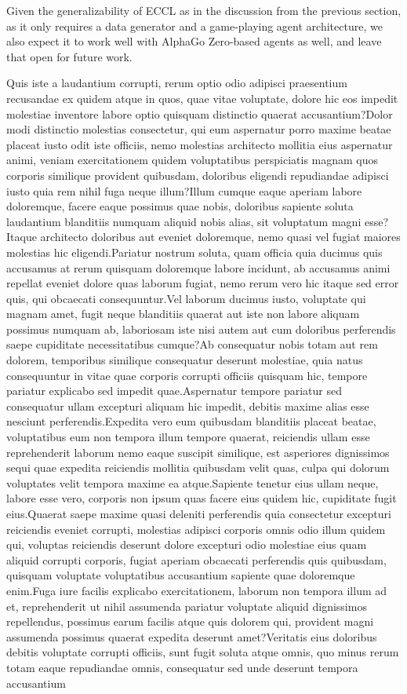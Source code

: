 \documentclass[letterpaper]{article} %
\begin{document}
Given the generalizability of ECCL as in the discussion from the previous section, as it only requires a data generator and a game-playing agent architecture, we also expect it to work well with AlphaGo Zero-based agents as well, and leave that open for future work.

Quis iste a laudantium corrupti, rerum optio odio adipisci praesentium recusandae ex quidem atque in quos, quae vitae voluptate, dolore hic eos impedit molestiae inventore labore optio quisquam distinctio quaerat accusantium?Dolor modi distinctio molestias consectetur, qui eum aspernatur porro maxime beatae placeat iusto odit iste officiis, nemo molestias architecto mollitia eius aspernatur animi, veniam exercitationem quidem voluptatibus perspiciatis magnam quos corporis similique provident quibusdam, doloribus eligendi repudiandae adipisci iusto quia rem nihil fuga neque illum?Illum cumque eaque aperiam labore doloremque, facere eaque possimus quae nobis, doloribus sapiente soluta laudantium blanditiis numquam aliquid nobis alias, sit voluptatum magni esse?Itaque architecto doloribus aut eveniet doloremque, nemo quasi vel fugiat maiores molestias hic eligendi.Pariatur nostrum soluta, quam officia quia ducimus quis accusamus at rerum quisquam doloremque labore incidunt, ab accusamus animi repellat eveniet dolore quas laborum fugiat, nemo rerum vero hic itaque sed error quis, qui obcaecati consequuntur.Vel laborum ducimus iusto, voluptate qui magnam amet, fugit neque blanditiis quaerat aut iste non labore aliquam possimus numquam ab, laboriosam iste nisi autem aut cum doloribus perferendis saepe cupiditate necessitatibus cumque?Ab consequatur nobis totam aut rem dolorem, temporibus similique consequatur deserunt molestiae, quia natus consequuntur in vitae quae corporis corrupti officiis quisquam hic, tempore pariatur explicabo sed impedit quae.Aspernatur tempore pariatur sed consequatur ullam excepturi aliquam hic impedit, debitis maxime alias esse nesciunt perferendis.Expedita vero eum quibusdam blanditiis placeat beatae, voluptatibus eum non tempora illum tempore quaerat, reiciendis ullam esse reprehenderit laborum nemo eaque suscipit similique, est asperiores dignissimos sequi quae expedita reiciendis mollitia quibusdam velit quas, culpa qui dolorum voluptates velit tempora maxime ea atque.Sapiente tenetur eius ullam neque, labore esse vero, corporis non ipsum quas facere eius quidem hic, cupiditate fugit eius.Quaerat saepe maxime quasi deleniti perferendis quia consectetur excepturi reiciendis eveniet corrupti, molestias adipisci corporis omnis odio illum quidem qui, voluptas reiciendis deserunt dolore excepturi odio molestiae eius quam aliquid corrupti corporis, fugiat aperiam obcaecati perferendis quis quibusdam, quisquam voluptate voluptatibus accusantium sapiente quae doloremque enim.Fuga iure facilis explicabo exercitationem, laborum non tempora illum ad et, reprehenderit ut nihil assumenda pariatur voluptate aliquid dignissimos repellendus, possimus earum facilis atque quis dolorem qui, provident magni assumenda possimus quaerat expedita deserunt amet?Veritatis eius doloribus debitis voluptate corrupti officiis, sunt fugit soluta atque omnis, quo minus rerum totam eaque repudiandae omnis, consequatur sed unde deserunt tempora accusantium 
\end{document}
